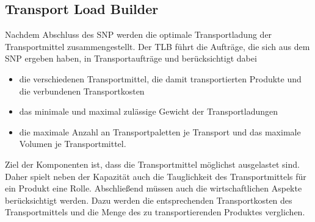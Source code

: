 \subsection{Transport Load Builder}
Nachdem Abschluss des \ac{SNP} werden die optimale Transportladung der Transportmittel zusammengestellt. 
Der \ac{TLB} führt die Aufträge, die sich aus dem \ac{SNP} ergeben haben, in Transportaufträge und berücksichtigt dabei \cite[Abschnitt 4.3.4, Seite 5]{scm:script_17_1}
\begin{itemize}
	\item die verschiedenen Transportmittel, die damit transportierten Produkte und die verbundenen Transportkosten
	\item das minimale und maximal zulässige Gewicht der Transportladungen
	\item die maximale Anzahl an Transportpaletten je Transport und das maximale Volumen je Transportmittel.
\end{itemize}

Ziel der Komponenten ist, dass die Transportmittel möglichst ausgelastet sind. Daher spielt neben der Kapazität auch die Tauglichkeit des Transportmittels für ein Produkt eine Rolle. Abschließend müssen auch die wirtschaftlichen Aspekte berücksichtigt werden. Dazu werden die entsprechenden Transportkosten des Transportmittels und die Menge des zu transportierenden Produktes verglichen.

